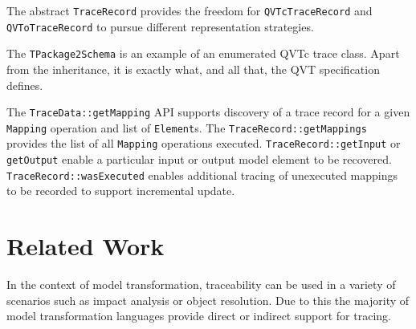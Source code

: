 \documentclass[runningheads,a4paper]{llncs}
\begin{document}
The abstract \verb|TraceRecord| provides the freedom for \verb|QVTcTraceRecord| and \verb|QVToTraceRecord| to pursue different representation strategies.

The \verb|TPackage2Schema| is an example of an enumerated QVTc trace class. Apart from the inheritance, it is exactly what, and all that, the QVT specification defines.

The \verb|TraceData::getMapping| API supports discovery of a trace record for a given  \verb|Mapping| operation and list of  \verb|Element|s. The  \verb|TraceRecord::getMappings| provides the list of all  \verb|Mapping| operations executed.  \verb|TraceRecord::getInput| or  \verb|getOutput| enable a particular input or output model element to be recovered.  \verb|TraceRecord::wasExecuted| enables additional tracing of unexecuted mappings to be recorded to support incremental update. 

\section{Related Work}\label{related}

In the context of model transformation, traceability can be used in a variety of
scenarios such as impact analysis or object resolution. Due to this the majority
of model transformation languages provide direct or indirect support for
tracing.
\end{document}
